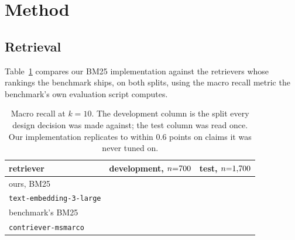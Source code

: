 \documentclass[11pt]{article}
\begin{document}
\section{Method}
\label{sec:long-method}


\subsection{Retrieval}
\label{sec:long-retrieval}


Table~\ref{tab:retrievers} compares our BM25 implementation against the retrievers whose
rankings the benchmark ships, on both splits, using the macro recall metric the
benchmark's own evaluation script computes.

\begin{table}[ht]
\centering
\caption{Macro recall at $k{=}10$. The development column is the split every design
decision was made against; the test column was read once. Our implementation replicates
to within 0.6 points on \nTest{} claims it was never tuned on.}
\label{tab:retrievers}
\begin{tabular}{lrr}
\toprule
retriever & development, $n{=}700{}$ & test, $n{=}1{,}700{} $ \\
\midrule
ours, BM25                       & \recallOursDev{}        & \recallOursTest{} \\
\texttt{text-embedding-3-large}  & \recallEmbedDev{}       & \recallEmbedTest{} \\
benchmark's BM25                 & \recallUpstreamBMDev{}  & \recallUpstreamBMTest{} \\
\texttt{contriever-msmarco}      & \recallContrieverDev{}  & \recallContrieverTest{} \\
\bottomrule
\end{tabular}
\end{table}

%
\end{document}
